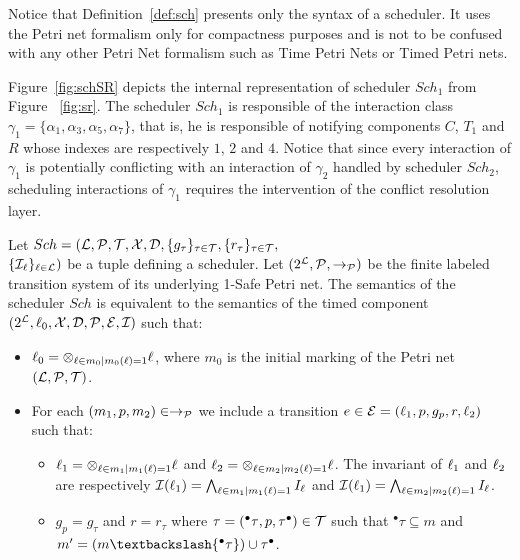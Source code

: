 Notice that Definition~\ref{def:sch} presents only the syntax of a scheduler. It uses 
the Petri net formalism only for compactness purposes and is not to be confused with 
any other Petri Net formalism such as Time Petri Nets or Timed Petri nets.

\begin{example}
  Figure~\ref{fig:schSR} depicts the internal representation of scheduler $Sch_1$ from Figure
  ~\ref{fig:sr}. The scheduler $Sch_1$ is responsible of the interaction class $\gamma_1=\{
    \alpha_1,\alpha_3,\alpha_5,\alpha_7\}$, that is, he is responsible of notifying components
  $C$, $T_1$ and $R$ whose indexes are respectively $1$, $2$ and $4$. Notice that since 
  every interaction of $\gamma_1$ is potentially conflicting with an interaction of $\gamma_2$
  handled by scheduler $Sch_2$, scheduling interactions of $\gamma_1$ requires the intervention
  of the conflict resolution layer.
\end{example}
\begin{property}
Let $Sch=(\mathcal{L}, \mathcal{P},\mathcal{T},\mathcal{X}, \mathcal{D},\{g_{\tau}\}_{\tau\in\mathcal{T}},
    \{r_{\tau}\}_{\tau\in\mathcal{T}},$\\$\{\mathcal{I}_{\ell}\}_{\ell\in\mathcal{L}})$ be a tuple defining 
  a scheduler. Let $(2^{\mathcal{L}},\mathcal{P},\to_{\mathcal{P}})$ be the finite labeled transition
  system of its underlying 1-Safe Petri net. The semantics of the scheduler $Sch$ 
  is equivalent to the semantics of the timed component 
  $(2^{\mathcal{L}},\ell_0,\mathcal{X},\mathcal{D},\mathcal{P},\mathcal{E},\mathcal{I})$ such that:
  \begin{itemize}
    \item $\ell_0=\otimes_{\ell\in m_0|m_0(\ell)=1}\ell$, where $m_0$ is the initial marking 
      of the Petri net $(\mathcal{L}, \mathcal{P},\mathcal{T})$.
    \item For each $(m_1,p,m_2)\in\to_{\mathcal{P}}$ we include a transition $e\in\mathcal{E}=
      (\ell_1,p,g_p,r,\ell_2)$ such that:
      \begin{itemize}
        \item $\ell_1=\otimes_{\ell\in m_1|m_1(\ell)=1}\ell$ and
              $\ell_2=\otimes_{\ell\in m_2|m_2(\ell)=1}\ell$. The invariant of $\ell_1$ and 
              $\ell_2$ are respectively 
              $\mathcal{I}(\ell_1)=\bigwedge_{\ell\in m_1|m_1(\ell)=1}I_{\ell}$ and
              $\mathcal{I}(\ell_1)=\bigwedge_{\ell\in m_2|m_2(\ell)=1}I_{\ell}$.
            \item $g_p=g_{\tau}$ and $r=r_{\tau}$ where 
              $\tau=({^\bullet\tau},p,{\tau^\bullet })\in\mathcal{T}$ such that
            ${^\bullet\tau}\subseteq m$ and $m'=(m\textbackslash{^\bullet\tau})
  \cup{\tau^\bullet }$.
      \end{itemize}
  \end{itemize}
\end{property}




